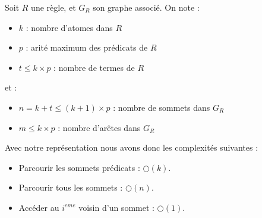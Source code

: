 
Soit $R$ une règle, et $G_R$ son graphe associé.
On note :
\begin{itemize}
	\item $k$ : nombre d'atomes dans $R$
	\item $p$ : arit\'e maximum des prédicats de $R$
	\item $t \leq k \times p$ : nombre de termes de $R$
\end{itemize}
et :
\begin{itemize}
	\item $n = k + t \leq (k+1) \times p$ : nombre de sommets dans $G_R$
	\item $m \leq k \times p$ : nombre d'arêtes dans $G_R$\\
\end{itemize}

Avec notre représentation nous avons donc les complexités suivantes :
\begin{itemize}
	\item Parcourir les sommets prédicats : $\bigcirc(k)$.
	\item Parcourir tous les sommets : $\bigcirc(n)$.
	\item Acc\'eder au $i^{eme}$ voisin d'un sommet : $\bigcirc(1)$.\\
\end{itemize}



	

%	

